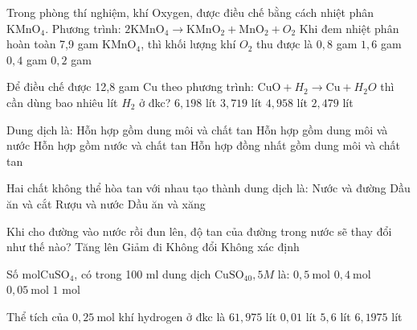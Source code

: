 \begin{ex}
	Trong phòng thí nghiệm, khí Oxygen, được điều chế bằng cách nhiệt phân $\mathrm{KMnO}_4$. Phương trình: $2\mathrm{KMnO}_4\to \mathrm{KMnO}_2+\mathrm{MnO}_2+O_2$ 
	Khi đem nhiệt phân hoàn toàn 7,9 gam $\mathrm{KMnO}_4$, thì khối lượng khí $O_2$ thu được là
	\choice
	{$0{,}8$ gam}
	{$1{,}6$ gam}
	{$0{,}4$ gam}
	{$0{,}2$ gam}
	\loigiai{}
\end{ex}

\begin{ex}
	Để điều chế được 12,8 gam Cu theo phương trình: $\mathrm{CuO}+H_2\to \mathrm{Cu}+H_2O$ thì cần dùng bao nhiêu lít $H_2$ ở đkc?
	\choice
	{$6{,}198$ lít}
	{$3{,}719$ lít}
	{$4{,}958$ lít}
	{$2{,}479$ lít}
	\loigiai{}
\end{ex}

\begin{ex}
	Dung dịch là:
	\choice
	{Hỗn hợp gồm dung môi và chất tan}
	{Hỗn hợp gồm dung môi và nước}
	{Hỗn hợp gồm nước và chất tan}
	{Hỗn hợp đồng nhất gồm dung môi và chất tan}
	\loigiai{}
\end{ex}

\begin{ex}
	Hai chất không thể hòa tan với nhau tạo thành dung dịch là:
	\choice
	{Nước và đường}
	{Dầu ăn và cắt}
	{Rượu và nước}
	{Dầu ăn và xăng}
	\loigiai{}
\end{ex}

\begin{ex}
	Khi cho đường vào nước rồi đun lên, độ tan của đường trong nước sẽ thay đổi như thế nào?
	\choice
	{Tăng lên}
	{Giảm đi}
	{Không đổi}
	{Không xác định}
	\loigiai{}
\end{ex}

\begin{ex}
	Số $\mathrm{mol} \mathrm{CuSO}_4$, có trong 100 ml dung dịch $\mathrm{CuSO}_40,5M$ là:
	\choice
	{$0,5\mathrm{~mol}$}
	{$0,4\mathrm{~mol}$}
	{$0,05\mathrm{~mol}$}
	{$1$ mol}
	\loigiai{}
\end{ex}

\begin{ex}
	Thể tích của $0,25\mathrm{~mol}$ khí hydrogen ở đkc là
	\choice
	{$61{,}975$ lít}
	{$0{,}01$ lít}
	{$5{,}6$ lít}
	{$6{,}1975$ lít}
	\loigiai{}
\end{ex}

